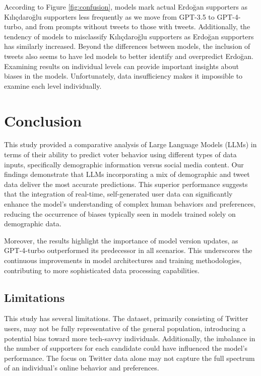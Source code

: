 \documentclass[sigconf,natbib=false]{acmart}
\begin{document}
According to Figure \ref{fig:confusion}, models mark actual Erdoğan supporters as Kılıçdaroğlu supporters less frequently as we move from GPT-3.5 to GPT-4-turbo, and from prompts without tweets to those with tweets. Additionally, the tendency of models to misclassify Kılıçdaroğlu supporters as Erdoğan supporters has similarly increased. Beyond the differences between models, the inclusion of tweets also seems to have led models to better identify and overpredict Erdoğan. Examining results on individual levels can provide important insights about biases in the models. Unfortunately, data insufficiency makes it impossible to examine each level individually.


\section{Conclusion}
This study provided a comparative analysis of Large Language Models (LLMs) in terms of their ability to predict voter behavior using different types of data inputs, specifically demographic information versus social media content. Our findings demonstrate that LLMs incorporating a mix of demographic and tweet data deliver the most accurate predictions. This superior performance suggests that the integration of real-time, self-generated user data can significantly enhance the model's understanding of complex human behaviors and preferences, reducing the occurrence of biases typically seen in models trained solely on demographic data.

Moreover, the results highlight the importance of model version updates, as GPT-4-turbo outperformed its predecessor in all scenarios. This underscores the continuous improvements in model architectures and training methodologies, contributing to more sophisticated data processing capabilities.

\subsection{Limitations}
This study has several limitations. The dataset, primarily consisting of Twitter users, may not be fully representative of the general population, introducing a potential bias toward more tech-savvy individuals. Additionally, the imbalance in the number of supporters for each candidate could have influenced the model's performance. The focus on Twitter data alone may not capture the full spectrum of an individual's online behavior and preferences.
\end{document}
